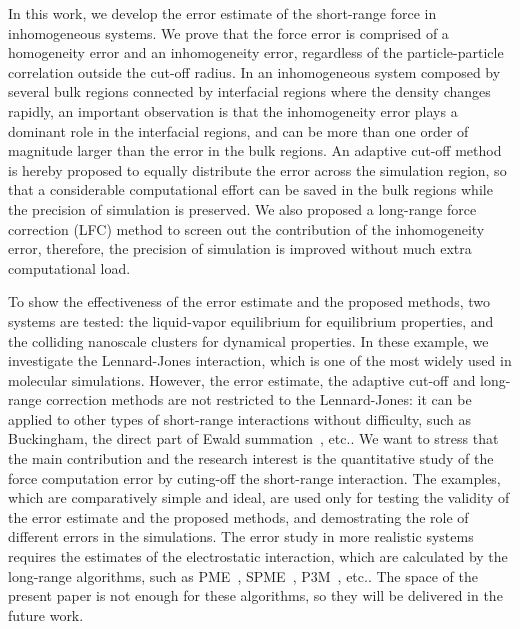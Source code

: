 \documentclass[preprint]{revtex4}
\newcommand{\recheck}[1]{{\color{red} #1}}
\begin{document}
In this work, we develop the error estimate of the short-range force
in inhomogeneous systems. We prove that the 
force error is comprised of a homogeneity error and an inhomogeneity
error, regardless of the particle-particle correlation outside the
cut-off radius.  In an inhomogeneous system composed by several bulk
regions connected by interfacial regions where the density changes
rapidly, an important observation is that the
inhomogeneity error plays a dominant role in the interfacial regions,
and can be more than one order of magnitude larger than
the error in the bulk regions. An
adaptive cut-off method is hereby proposed to equally distribute the
error across the simulation region, so that a considerable
computational effort can be saved in the bulk regions
while the precision of simulation is
preserved. We also proposed a long-range force correction (LFC) method
to screen out the contribution of the
inhomogeneity error, therefore,  the precision of
simulation is improved without much extra computational load.


To show the
effectiveness of the error estimate and the proposed methods, two
systems are tested: the liquid-vapor equilibrium for equilibrium
properties, and the colliding nanoscale clusters for dynamical
properties.
\recheck{
  In these example, we investigate the Lennard-Jones interaction, which
  is one of the most widely used in molecular simulations.
  However, the error estimate,
  the adaptive cut-off and long-range correction methods
  are not restricted to the Lennard-Jones: it can
  be applied to other types of short-range interactions without 
  difficulty, such as
  Buckingham, the direct part of Ewald summation~\cite{ewald1921die}, etc..
  We want to stress that the main contribution and the research interest is the
  quantitative study of the force computation error by cuting-off
  the short-range interaction.
  The examples, which are comparatively simple and ideal,
  are used only for testing the validity of the error
  estimate and the proposed methods,
  and demostrating the role of different errors in the simulations.
  The error study in more realistic systems requires the
  estimates of the electrostatic interaction,
  which are calculated by the long-range algorithms, such as
  PME~\cite{darden1993pme}, SPME~\cite{essmann1995spm},
  P3M~\cite{deserno1998mue1}, etc..
  The space of the present paper is not enough for
  these algorithms, so they will be delivered in the future work.
}
\end{document}
